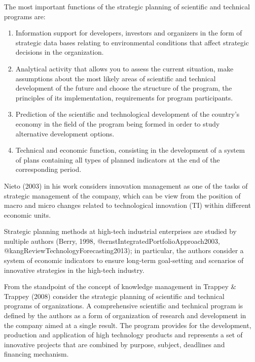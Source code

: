 \documentclass[12pt,twoside]{reedthesis}
\providecommand{\tightlist}{%
  \setlength{\itemsep}{0pt}\setlength{\parskip}{0pt}}
\begin{document}
The most important functions of the strategic planning of scientific and technical programs are:
\begin{enumerate}
\def\labelenumi{\arabic{enumi}.}
\tightlist
\item
  Information support for developers, investors and organizers in the form of strategic data bases relating to environmental conditions that affect strategic decisions in the organization.
\item
  Analytical activity that allows you to assess the current situation, make assumptions about the most likely areas of scientific and technical development of the future and choose the structure of the program, the principles of its implementation, requirements for program participants.
\item
  Prediction of the scientific and technological development of the country's economy in the field of the program being formed in order to study alternative development options.
\item
  Technical and economic function, consisting in the development of a system of plans containing all types of planned indicators at the end of the corresponding period.
\end{enumerate}
Nieto (2003) in his work considers innovation management as one of the tasks of strategic management of the company, which can be view from the position of macro and micro changes related to technological innovation (TI) within different economic units.

Strategic planning methods at high-tech industrial enterprises are studied by multiple authors (Berry, 1998, @ernstIntegratedPortfolioApproach2003, @kangReviewTechnologyForecasting2013); in particular, the authors consider a system of economic indicators to ensure long-term goal-setting and scenarios of innovative strategies in the high-tech industry.

From the standpoint of the concept of knowledge management in Trappey \& Trappey (2008) consider the strategic planning of scientific and technical programs of organizations. A comprehensive scientific and technical program is defined by the authors as a form of organization of research and development in the company aimed at a single result. The program provides for the development, production and application of high technology products and represents a set of innovative projects that are combined by purpose, subject, deadlines and financing mechanism.
\end{document}
